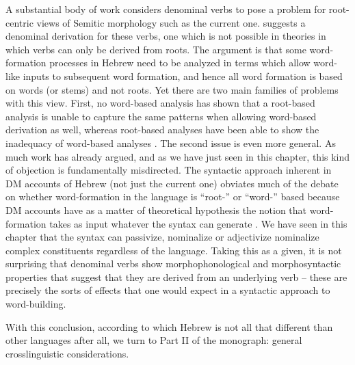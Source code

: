 A substantial body of work considers denominal verbs to pose a problem for root-centric views of Semitic morphology such as the current one. \cite{batel94,batel03,batel17} suggests a denominal derivation for these verbs, one which is not possible in theories in which verbs can only be derived from roots. The argument is that some word-formation processes in Hebrew need to be analyzed in terms which allow word-like inputs to subsequent word formation, and hence all word formation is based on words (or stems) and not roots. Yet there are two main families of problems with this view. First, no word-based analysis has shown that a root-based analysis is unable to capture the same patterns when allowing word-based derivation as well, whereas root-based analyses have been able to show the inadequacy of word-based analyses \citep{kastner18nllt}. The second issue is even more general. As much work \citep{arad03,arad05,doron03} has already argued, and as we have just seen in this chapter, this kind of objection is fundamentally misdirected. The syntactic approach inherent in DM accounts of Hebrew (not just the current one) obviates much of the debate on whether word-formation in the language is ``root-'' or ``word-'' based because DM accounts have as a matter of theoretical hypothesis the notion that word-formation takes as input whatever the syntax can generate \citep{kastnertucker19cup}. We have seen in this chapter that the syntax can passivize, nominalize or adjectivize nominalize complex constituents regardless of the language. Taking this as a given, it is not surprising that denominal verbs show morphophonological and morphosyntactic properties that suggest that they are derived from an underlying verb -- these are precisely the sorts of effects that one would expect in a syntactic approach to word-building.

With this conclusion, according to which Hebrew is not all that different than other languages after all, we turn to Part II of the monograph: general crosslinguistic considerations.




